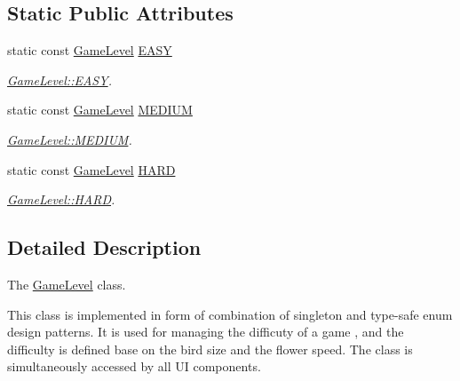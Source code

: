 \subsection*{Static Public Attributes}
\begin{DoxyCompactItemize}
\item 
static const \hyperlink{class_game_level}{Game\+Level} \hyperlink{class_game_level_a4de2cb0a8609b8e9a76f64a1502a71de}{E\+A\+S\+Y}
\begin{DoxyCompactList}\small\item\em \hyperlink{class_game_level_a4de2cb0a8609b8e9a76f64a1502a71de}{Game\+Level\+::\+E\+A\+S\+Y}. \end{DoxyCompactList}\item 
\hypertarget{class_game_level_aaf2d9c7c8b6b88817451aa23442477c9}{}static const \hyperlink{class_game_level}{Game\+Level} \hyperlink{class_game_level_aaf2d9c7c8b6b88817451aa23442477c9}{M\+E\+D\+I\+U\+M}\label{class_game_level_aaf2d9c7c8b6b88817451aa23442477c9}

\begin{DoxyCompactList}\small\item\em \hyperlink{class_game_level_aaf2d9c7c8b6b88817451aa23442477c9}{Game\+Level\+::\+M\+E\+D\+I\+U\+M}. \end{DoxyCompactList}\item 
\hypertarget{class_game_level_adec4e386d38dfb062e733098696524a7}{}static const \hyperlink{class_game_level}{Game\+Level} \hyperlink{class_game_level_adec4e386d38dfb062e733098696524a7}{H\+A\+R\+D}\label{class_game_level_adec4e386d38dfb062e733098696524a7}

\begin{DoxyCompactList}\small\item\em \hyperlink{class_game_level_adec4e386d38dfb062e733098696524a7}{Game\+Level\+::\+H\+A\+R\+D}. \end{DoxyCompactList}\end{DoxyCompactItemize}


\subsection{Detailed Description}
The \hyperlink{class_game_level}{Game\+Level} class. 

This class is implemented in form of combination of singleton and type-\/safe enum design patterns. It is used for managing the difficuty of a game , and the difficulty is defined base on the bird size and the flower speed. The class is simultaneously accessed by all U\+I components. 

